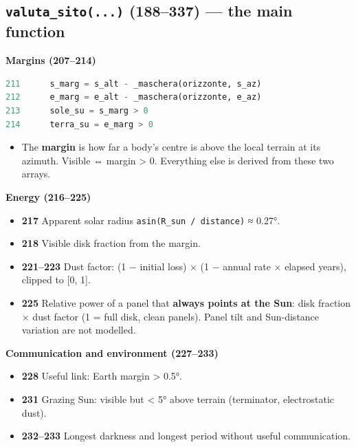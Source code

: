 \documentclass[11pt,a4paper]{article}
\providecommand{\tightlist}{\setlength{\itemsep}{0pt}\setlength{\parskip}{0pt}}
\begin{document}
\hypertarget{valuta_sito...-188337-the-main-function}{%
\subsection{\texorpdfstring{\texttt{valuta\_sito(...)} (188--337) ---
the main
function}{valuta\_sito(...) (188--337) --- the main function}}\label{valuta_sito...-188337-the-main-function}}

\textbf{Margins (207--214)}

\begin{lstlisting}[language=Python]
211      s_marg = s_alt - _maschera(orizzonte, s_az)
212      e_marg = e_alt - _maschera(orizzonte, e_az)
213      sole_su = s_marg > 0
214      terra_su = e_marg > 0
\end{lstlisting}

\begin{itemize}
\tightlist
\item
  The \textbf{margin} is how far a body's centre is above the local
  terrain at its azimuth. Visible ⇔ margin \textgreater{} 0. Everything
  else is derived from these two arrays.
\end{itemize}

\textbf{Energy (216--225)}

\begin{itemize}
\tightlist
\item
  \textbf{217} Apparent solar radius
  \texttt{asin(R\_sun / distance)} ≈ 0.27°.
\item
  \textbf{218} Visible disk fraction from the margin.
\item
  \textbf{221--223} Dust factor: (1 − initial loss) × (1 − annual rate ×
  elapsed years), clipped to {[}0, 1{]}.
\item
  \textbf{225} Relative power of a panel that \textbf{always points at
  the Sun}: disk fraction × dust factor (1 = full disk, clean panels).
  Panel tilt and Sun-distance variation are not modelled.
\end{itemize}

\textbf{Communication and environment (227--233)}

\begin{itemize}
\tightlist
\item
  \textbf{228} Useful link: Earth margin \textgreater{} 0.5°.
\item
  \textbf{231} Grazing Sun: visible but \textless{} 5° above terrain
  (terminator, electrostatic dust).
\item
  \textbf{232--233} Longest darkness and longest period without useful
  communication.
\end{itemize}
\end{document}
